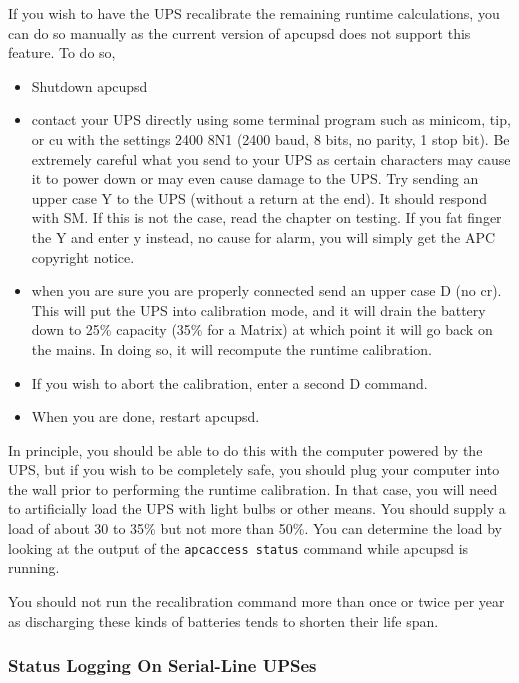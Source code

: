 {{{{{{{{{{If you wish to have the UPS recalibrate the remaining runtime calculations,
you can do so manually as the current version of apcupsd does not support this
feature. To do so,  

\begin{itemize}
\item Shutdown apcupsd  
\item contact your UPS directly using some terminal program such as minicom,
tip, or cu with the settings 2400 8N1 (2400 baud, 8 bits, no parity, 1 stop
bit). Be extremely careful what you send to your UPS as certain characters may
cause it to power down or may even cause damage to the UPS. Try sending an
upper case Y to the UPS (without a return at the end). It should respond with
SM. If this is not the case, read the chapter on testing. If you fat finger
the Y and enter y instead, no cause for alarm, you will simply get the APC
copyright notice.  
\item when you are sure you are properly connected send an upper case D (no
cr). This will put the UPS into calibration mode, and it will drain the
battery down to 25\% capacity (35\% for a Matrix) at which point it will go
back on the mains. In doing so, it will recompute the runtime calibration.  
\item If you wish to abort the calibration, enter a second D command.  
\item When you are done, restart apcupsd. 
\end{itemize}

In principle, you should be able to do this with the computer powered by the
UPS, but if you wish to be completely safe, you should plug your computer into
the wall prior to performing the runtime calibration. In that case, you will
need to artificially load the UPS with light bulbs or other means. You should
supply a load of about 30 to 35\% but not more than 50\%. You can determine
the load by looking at the output of the {\tt apcaccess status} command while
apcupsd is running.  

You should not run the recalibration command more than once or twice per year
as discharging these kinds of batteries tends to shorten their life span. 

\label{Status-Logging-On-Serial_002dLine-UPSes}

\subsubsection*{Status Logging On Serial-Line UPSes}

}}}}}}}}}}
